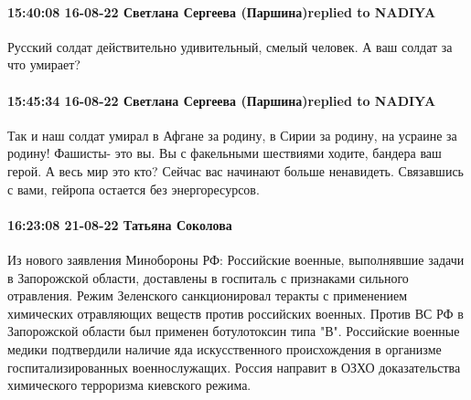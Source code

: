  
 
 
 
 


\paragraph{15:40:08 16-08-22 Светлана Сергеева (Паршина)replied to NADIYA}

Русский солдат действительно удивительный, смелый человек. А ваш солдат за что умирает?


\paragraph{15:45:34 16-08-22 Светлана Сергеева (Паршина)replied to NADIYA}

Так и наш солдат умирал в Афгане за родину, в Сирии за родину, на усраине за
родину! Фашисты- это вы. Вы с факельными шествиями ходите, бандера ваш герой. А
весь мир это кто? Сейчас вас начинают больше ненавидеть. Связавшись с вами,
гейропа остается без энергоресурсов.

\paragraph{16:23:08 21-08-22 Татьяна Соколова}

Из нового заявления Минобороны РФ:
Российские военные, выполнявшие задачи в Запорожской области, доставлены в госпиталь с признаками сильного отравления. Режим Зеленского санкционировал теракты с применением химических отравляющих веществ против российских военных. Против ВС РФ в Запорожской области был применен ботулотоксин типа "В".
Российские военные медики подтвердили наличие яда искусственного происхождения в организме госпитализированных военнослужащих. Россия направит в ОЗХО доказательства химического терроризма киевского режима.

